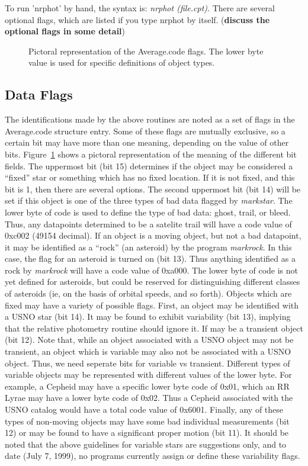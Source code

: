 \documentclass{article}
\newcommand{\note}[1]{({\bf #1})}
\newcommand\pr{\em}                   %
\begin{document}
To run 'nrphot' by hand, the syntax is: {\pr nrphot (file.cpt)}.
There are several optional flags, which are listed if you type nrphot
by itself.  \note{discuss the optional flags in some detail}

\begin{figure}
\caption{\label{flags} \small
  Pictoral representation of the Average.code flags.  The lower byte
  value is used for specific definitions of object types.  }
\end{figure}

\subsection{Data Flags}

The identifications made by the above routines are noted as a set of
flags in the Average.code structure entry.  Some of these flags are
mutually exclusive, so a certain bit may have more than one meaning,
depending on the value of other bits.  Figure~\ref{flags} shows a
pictoral representation of the meaning of the different bit fields.
The uppermost bit (bit 15) determines if the object may be considered
a ``fixed'' star or something which has no fixed location.  If it is
not fixed, and this bit is 1, then there are several options.  The
second uppermost bit (bit 14) will be set if this object is one of the
three types of bad data flagged by {\pr markstar}.  The lower byte of
code is used to define the type of bad data: ghost, trail, or bleed.
Thus, any datapoints determined to be a satelite trail will have a
code value of 0xc002 (49154 decimal).  If an object is a moving
object, but not a bad datapoint, it may be identified as a ``rock''
(an asteroid) by the program {\pr markrock}.  In this case, the flag
for an asteroid is turned on (bit 13).  Thus anything identified as a
rock by {\pr markrock} will have a code value of 0xa000.  The lower
byte of code is not yet defined for asteroids, but could be reserved
for distinguishing different classes of asteroids (ie, on the basis of
orbital speeds, and so forth).  Objects which are fixed may have a
variety of possible flags.  First, an object may be identified with a
USNO star (bit 14).  It may be found to exhibit variability (bit 13),
implying that the relative photometry routine should ignore it.  If
may be a transient object (bit 12).  Note that, while an object
associated with a USNO object may not be transient, an object which is
variable may also not be associated with a USNO object.  Thus, we need
seperate bits for variable vs transient.  Different types of variable
objects may be represented with different values of the lower byte.
For example, a Cepheid may have a specific lower byte code of 0x01,
which an RR Lyrae may have a lower byte code of 0x02.  Thus a Cepheid
associated with the USNO catalog would have a total code value of
0x6001. Finally, any of these types of non-moving objects may have
some bad individual measurements (bit 12) or may be found to have a
significant proper motion (bit 11).  It should be noted that the above
guidelines for variable stars are suggestions only, and to date (July
7, 1999), no programs currently assign or define these variability flags. 
\end{document}

